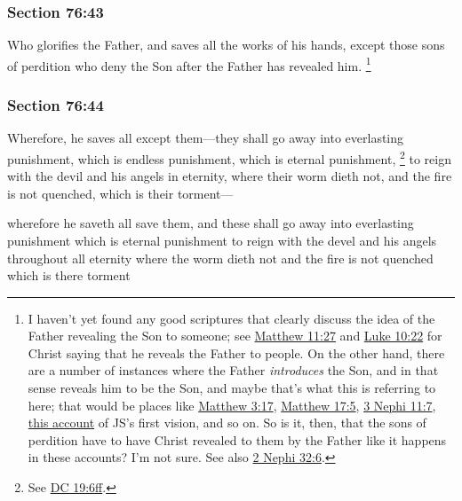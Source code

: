 	\subsubsection{Section 76:43} %
		\label{DC76-43}

		Who glorifies the Father, and saves all the works of his hands, except those sons of perdition who deny the Son after the Father has revealed him.%
			\footnote{%
				I haven't yet found any good scriptures that clearly discuss the idea of the Father revealing the Son to someone; see \hyperref[MATTHEW-11-27]{Matthew 11:27} and \hyperref[LUKE-10-22]{Luke 10:22} for Christ saying that he reveals the Father to people. On the other hand, there are a number of instances where the Father \textit{introduces} the Son, and in that sense reveals him to be the Son, and maybe that's what this is referring to here; that would be places like \hyperref[MATTHEW-3-17]{Matthew 3:17}, \hyperref[MATTHEW-17-5]{Matthew 17:5}, \hyperref[3NEPHI-11-7]{3 Nephi 11:7}, \href{https://www.josephsmithpapers.org/paper-summary/history-circa-june-1839-circa-1841-draft-2/3}{this account} of JS's first vision, and so on. So is it, then, that the sons of perdition have to have Christ revealed to them by the Father like it happens in these accounts? I'm not sure. See also \hyperref[2NEPHI-32-6]{2 Nephi 32:6}.
				}


	\subsubsection{Section 76:44} %
		\label{DC76-44}

		Wherefore, he saves all except them---they shall go away into everlasting punishment, which is endless punishment, which is eternal punishment,%
			\footnote{%
				See \hyperref[DC19-6]{DC 19:6ff}.
				}
		to reign with the devil and his angels in eternity, where their worm dieth not, and the fire is not quenched, which is their torment---

		\begin{framed}
		\scriptsize
			\begin{compactdesc}
				\item[JSP] wherefore he saveth all save them, and these shall go away into everlasting punishment which is eternal punishment to reign with the devel and his angels throughout all eternity where the worm dieth not and the fire is not quenched which is there torment
			\end{compactdesc}
		\end{framed}

